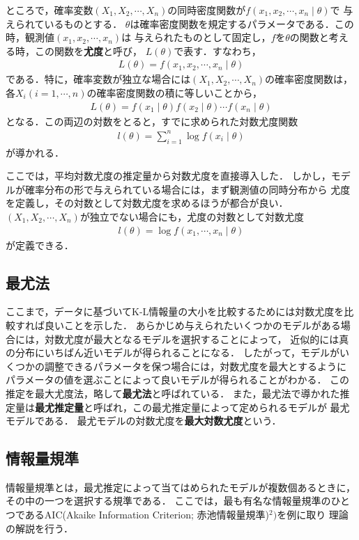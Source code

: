 ところで，確率変数$(X_1, X_2, \cdots, X_n)$の同時密度関数が$f(x_1, x_2, \cdots, x_n \mid \theta)$で
与えられているものとする．
$\theta$は確率密度関数を規定するパラメータである．この時，観測値$(x_1, x_2, \cdots, x_n)$は
与えられたものとして固定し，$f$を$\theta$の関数と考える時，この関数を\textbf{尤度}と呼び，
$L(\theta)$で表す．すなわち，
\begin{align*}
  L(\theta) = f(x_1, x_2, \cdots, x_n \mid \theta)
\end{align*}
である．特に，確率変数が独立な場合には$(X_1, X_2, \cdots, X_n)$の確率密度関数は，
各$X_i (i = 1, \cdots, n)$の確率密度関数の積に等しいことから，
\begin{align*}
  L(\theta) = f(x_1 \mid \theta)f(x_2 \mid \theta) \cdots f(x_n \mid \theta)
\end{align*}
となる．この両辺の対数をとると，すでに求められた対数尤度関数
\begin{align*}
  l(\theta) = \sum_{i=1}^{n}\log f(x_i \mid \theta)
\end{align*}
が導かれる．

ここでは，平均対数尤度の推定量から対数尤度を直接導入した．
しかし，モデルが確率分布の形で与えられている場合には，まず観測値の同時分布から
尤度を定義し，その対数として対数尤度を求めるほうが都合が良い．
$(X_1, X_2, \cdots, X_n)$が独立でない場合にも，尤度の対数として対数尤度
\begin{align*}
  l(\theta) = \log f(x_1, \cdots, x_n \mid \theta)
\end{align*}
が定義できる．

\subsection{最尤法}
ここまで，データに基づいてK-L情報量の大小を比較するためには対数尤度を比較すれば良いことを示した．
あらかじめ与えられたいくつかのモデルがある場合には，対数尤度が最大となるモデルを選択することによって，
近似的には真の分布にいちばん近いモデルが得られることになる．
したがって，モデルがいくつかの調整できるパラメータを保つ場合には，対数尤度を最大とするように
パラメータの値を選ぶことによって良いモデルが得られることがわかる．
この推定を最大尤度法，略して\textbf{最尤法}と呼ばれている．
また，最尤法で導かれた推定量は\textbf{最尤推定量}と呼ばれ，この最尤推定量によって定められるモデルが
最尤モデルである．
最尤モデルの対数尤度を\textbf{最大対数尤度}という．

\subsection{情報量規準}
情報量規準とは，最尤推定によって当てはめられたモデルが複数個あるときに，その中の一つを選択する規準である．
ここでは，最も有名な情報量規準のひとつであるAIC(Akaike Information Criterion; 赤池情報量規準)$^2)$を例に取り
理論の解説を行う．

